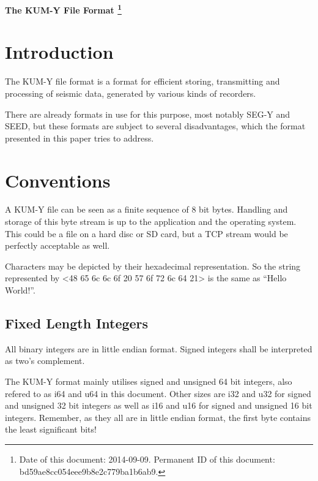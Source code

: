 \documentclass[DIV=10]{scrartcl}
\begin{document}
\strut

\vspace{1cm}

\centerline{\huge \textbf{The KUM-Y File Format%
\footnote{\raggedright Date of this document: 2014-09-09.
Permanent ID of this document: bd59ae8cc054eee9b8e2c779ba1b6ab9.}}}

\vspace{1cm}

\section{Introduction}

The KUM-Y file format is a format for efficient storing, transmitting and processing of seismic data, generated by various kinds of recorders.

There are already formats in use for this purpose, most notably SEG-Y and SEED, but these formats are subject to several disadvantages, which the format presented in this paper tries to address.

\section{Conventions}

A KUM-Y file can be seen as a finite sequence of 8 bit bytes.
Handling and storage of this byte stream is up to the application and the operating system.
This could be a file on a hard disc or SD card, but a TCP stream would be perfectly acceptable as well.

Characters may be depicted by their hexadecimal representation.
So the string represented by <48 65 6c 6c 6f 20 57 6f 72 6c 64 21> is the same as “Hello World!”.

\subsection{Fixed Length Integers}

All binary integers are in little endian format.
Signed integers shall be interpreted as two’s complement.

The KUM-Y format mainly utilises signed and unsigned 64 bit integers, also refered to as i64 and u64 in this document.
Other sizes are i32 and u32 for signed and unsigned 32 bit integers as well as i16 and u16 for signed and unsigned 16 bit integers.
Remember, as they all are in little endian format, the first byte contains the least significant bits!
\end{document}
